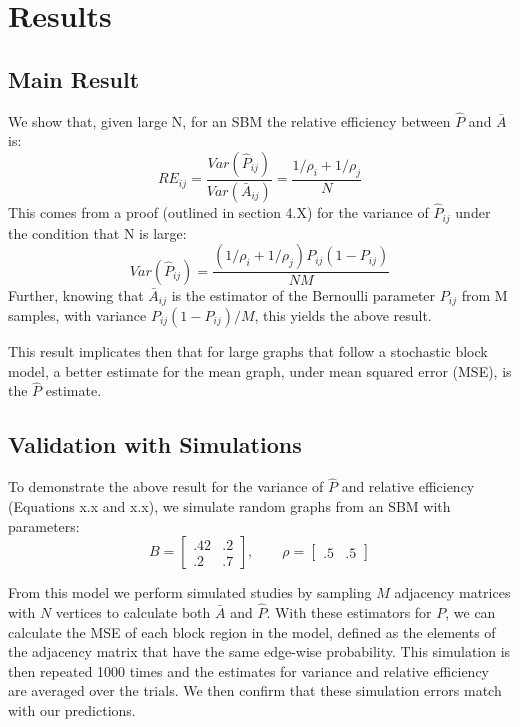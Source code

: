 \section{Results}
\subsection{Main Result}
We show that, given large N, for an SBM the relative efficiency between $\hat{P}$ and $\bar{A}$ is:
\begin{equation}
RE_{ij} =\frac{Var(\hat{P}_{ij})}{Var(\bar{A}_{ij})} = \frac{1/\rho_i + 1/\rho_j}{N}
\end{equation}
This comes from a proof (outlined in section 4.X) for the variance of $\hat{P}_{ij}$ under the condition that N is large:
\begin{equation}
Var(\hat{P}_{ij}) = \frac{(1/\rho_i + 1/\rho_j)P_{ij}(1-P_{ij})}{NM}
\end{equation}
Further, knowing that $\bar{A}_{ij}$ is the estimator of the Bernoulli parameter $P_{ij}$ from M samples, with variance $P_{ij}(1-P_{ij})/M$, this yields the above result.

This result implicates then that for large graphs that follow a stochastic block model, a better estimate for the mean graph, under mean squared error (MSE), is the $\hat{P}$ estimate.
\subsection{Validation with Simulations}
To demonstrate the above result for the variance of $\hat{P}$ and relative efficiency (Equations x.x and x.x), we simulate random graphs from an SBM with parameters:
\begin{equation*}
B = \begin{bmatrix}
.42 & .2 \\
.2 & .7 
\end{bmatrix}
,\qquad \rho = \begin{bmatrix}
.5 & .5
\end{bmatrix}
\end{equation*}

From this model we perform simulated studies by sampling $M$ adjacency matrices with $N$ vertices to calculate both $\bar{A}$ and $\hat{P}$.  With these estimators for $P$, we can calculate the MSE of each block region in the model, defined as the elements of the adjacency matrix that have the same edge-wise probability.  This simulation is then repeated 1000 times and the estimates for variance and relative efficiency are averaged over the trials.  We then confirm that these simulation errors match with our predictions.

